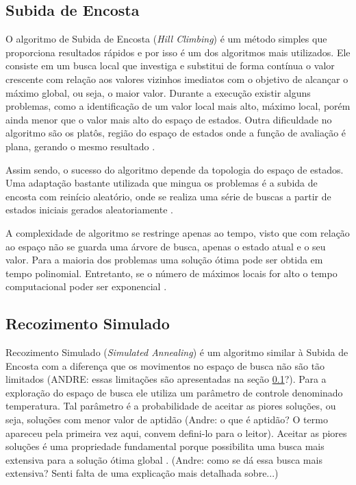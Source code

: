 \subsection{Subida de Encosta}
\label{sec:subidaDeEncosta}

O algoritmo de Subida de Encosta (\textit{Hill Climbing}) é um método simples que proporciona resultados rápidos e por isso é um dos algoritmos mais utilizados. Ele consiste em um busca local que investiga e substitui de forma contínua o valor crescente com relação aos valores vizinhos imediatos com o objetivo de alcançar o máximo global, ou seja, o maior valor. Durante a execução existir alguns problemas, como a identificação de um valor local mais alto, máximo local, porém ainda menor que o valor mais alto do espaço de estados. Outra dificuldade no algoritmo são os platôs, região do espaço de estados onde a função de avaliação é plana, gerando o mesmo resultado \cite{russell2016artificial}.

Assim sendo, o sucesso do algoritmo depende da topologia do espaço de estados. Uma adaptação bastante utilizada que mingua os problemas é a subida de encosta com reinício aleatório, onde se realiza uma série de buscas a partir de estados iniciais gerados aleatoriamente \cite{russell2016artificial}. 

A complexidade de algoritmo se restringe apenas ao tempo, visto que com relação ao espaço não se guarda uma árvore de busca, apenas o estado atual e o seu valor. Para a maioria dos problemas uma solução ótima pode ser obtida em tempo polinomial. Entretanto, se o número de máximos locais for alto o tempo computacional poder ser exponencial \cite{skiena1998algorithm}.

\subsection{Recozimento Simulado}

Recozimento Simulado (\textit{Simulated Annealing}) é um algoritmo similar à Subida de Encosta com a diferença que os movimentos no espaço de busca não são tão limitados (ANDRE: essas limitações são apresentadas na seção \ref{sec:subidaDeEncosta}?). Para a exploração do espaço de busca ele utiliza um parâmetro de controle denominado temperatura. Tal parâmetro é a probabilidade de aceitar as piores soluções, ou seja, soluções com menor valor de aptidão (Andre: o que é aptidão? O termo apareceu pela primeira vez aqui, convem defini-lo para o leitor).  Aceitar as piores soluções é uma propriedade fundamental porque possibilita uma busca mais extensiva para a solução ótima global \cite{kirkpatrick1983optimization}. (Andre: como se dá essa busca mais extensiva? Senti falta de uma explicação mais detalhada sobre...)


